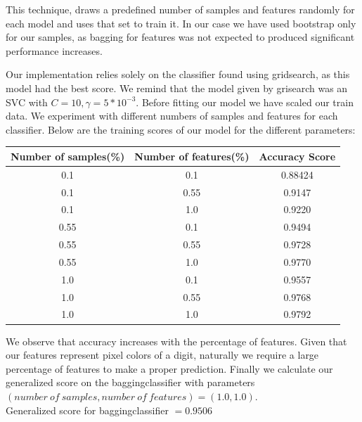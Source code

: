 \documentclass{article}
\begin{document}
This technique, draws a predefined number of samples and features randomly for each model and uses that set to train it. 
In our case we have used bootstrap only for our samples, as bagging for features was not expected to  produced significant performance increases.

Our implementation relies solely on the classifier found using gridsearch, as this model had the best score.
We remind that the model given by grisearch was an SVC with $C = 10, \gamma = 5* 10^ {-3}$. Before fitting our model we have scaled our train data.
We experiment with different numbers of samples and features for each classifier.
Below are the training scores of our model for the different parameters:
\begin{table}[ht]
    
    \begin{tabular}{| c | c | c |}  
        
        \hline
        \rule{0pt}{4ex} \large Number of samples(\%) & \large Number of features(\%) & \large Accuracy Score \\
        \hline
        0.1 & 0.1 & 0.88424 \\
        \hline
        0.1 & 0.55 & 0.9147\\
        \hline
        0.1 & 1.0 & 0.9220 \\
        \hline        
        0.55 & 0.1 & 0.9494\\
        \hline
        0.55 & 0.55 & 0.9728 \\
        \hline
        0.55 & 1.0 & 0.9770\\
        \hline
        1.0 & 0.1 & 0.9557 \\
        \hline
        1.0 & 0.55 & 0.9768 \\
        \hline
        1.0 & 1.0 & 0.9792 \\
        \hline 
    \end{tabular}
\end{table}
\newpage
We observe that accuracy increases with the percentage of features.
Given that our features represent pixel colors of a digit, naturally we require a large percentage of features to make a proper prediction.
Finally we calculate our generalized score on the baggingclassifier with parameters\\
\((number \ of \ samples, number \ of \ features) = (1.0, 1.0)\).\\
Generalized score for baggingclassifier $=0.9506$
\end{document}
